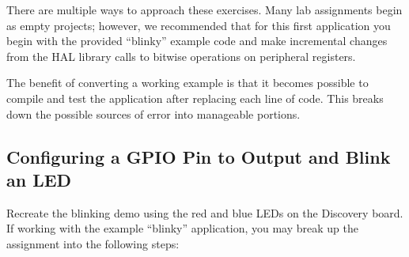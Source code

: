 \documentclass[openany,11pt,fleqn]{book} %
\begin{document}
There are multiple ways to approach these exercises. Many lab assignments begin as empty projects; however, we recommended that for this first application you begin with the provided ``blinky'' example code and make incremental changes from the HAL library calls to bitwise operations on peripheral registers.

The benefit of converting a working example is that it becomes possible to compile and test the application after replacing each line of code. This breaks down the possible sources of error into manageable portions. 

\subsection{Configuring a GPIO Pin to Output and Blink an LED}

Recreate the blinking demo using the red and blue LEDs on the Discovery board. If working with the example ``blinky'' application, you may break up the assignment into the following steps:
\end{document}
